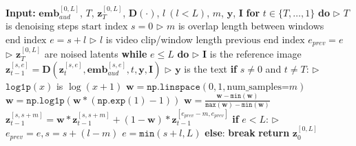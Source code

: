 \begin{algorithm}[t!]
\caption{Dynamic Weighted Sliding-Window Strategy}
\label{alg:sliding_window}
\begin{algorithmic}[1]
\small 
\State \textbf{Input:} {$\bm{emb}_{aud}^{[0,L]}$, $T$, $\bm{z}_{T}^{[0,L]}$, $\bm{D}(\cdot)$, $l~(l<L)$, $m$, $\bm{y}$, $\bm{I}$} 
    \State \textbf{for} $t \in \{T, \ldots, 1\}$ \textbf{do} \hfill $\triangleright$ $T$ is denoising steps
        \State \hspace{0.5em} $\text{start index }s=0$ \hfill $\triangleright$ $m$ is overlap length between windows
        \State \hspace{0.5em} $\text{end index }e=s+l$ \hfill $\triangleright$ $l$ is video clip/window length
        \State \hspace{0.5em} $\text{previous end index }e_{prev}=e$ \hfill $\triangleright$ $\bm{z}_{T}^{[0,L]}$ are noised latents
        \State \hspace{0.5em} \textbf{while} $e\le L$ \textbf{do} \hfill $\triangleright$ $\bm{I}$ is the reference image
        \State \hspace{1.2em} $\bm{z}_{t-1}^{[s, e]}=\bm{D}(\bm{z}_{t}^{[s, e]},\bm{emb}_{aud}^{[s, e]},t,\bm{y},\bm{I})$ \hfill $\triangleright$ $\bm{y}$ is the text
        \State \hspace{1.2em} \textbf{if} $s\ne0$ and $t \ne T$: \hfill $\triangleright$ $\mathtt{log1p}(x)$ is $\log(x+1)$
        \State \hspace{1.8em} $\bm{w}=\mathtt{np.linspace}(0,1,\text{num\_samples=}m)$
        \State \hspace{1.8em} $\bm{w}=\mathtt{np.log1p}(\bm{w} * (\mathtt{np.exp}(1) - 1))$
        \State \hspace{1.8em} $\bm{w}=\frac{\bm{w}-\mathtt{min}(\bm{w})}{\mathtt{max}(\bm{w})-\mathtt{min}(\bm{w})}$
        \State \hspace{1.8em} $\bm{z}_{t-1}^{[s,s+m]}=\bm{w}*\bm{z}_{t-1}^{[s,s+m]}+(1-\bm{w})*\bm{z}_{t-1}^{[e_{prev}-m,e_{prev}]}$
        \State \hspace{1.2em}  \textbf{if} $e<L$: \hfill $\triangleright$ 
        \State \hspace{1.8em} $e_{prev}=e, s=s+(l-m)$
        \State \hspace{1.8em}  $e=\mathtt{min}(s+l, L)$
        \State \hspace{1.2em}  \textbf{else}: \textbf{break}
    \State \textbf{return} $\bm{z}_{0}^{[0,L]}$
\end{algorithmic}
\vspace{-0.1cm}
\end{algorithm}

